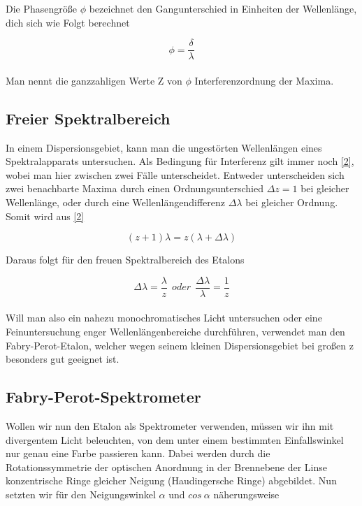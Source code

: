 \documentclass{article}
\begin{document}
Die Phasengröße \(\phi \) bezeichnet den Gangunterschied in Einheiten der Wellenlänge, dich sich wie Folgt berechnet

\begin{equation}
\label{3}
\phi = \frac {\delta}{\lambda}
\end{equation}\\

Man nennt die ganzzahligen Werte Z von \(\phi \) Interferenzordnung der Maxima.

\subsection{Freier Spektralbereich}
In einem Dispersionsgebiet, kann man die ungestörten Wellenlängen eines Spektralapparats untersuchen. Als Bedingung für Interferenz gilt immer noch \eqref{2}, wobei man hier zwischen zwei Fälle unterscheidet. Entweder unterscheiden sich zwei benachbarte Maxima durch einen Ordnungsunterschied \(\Delta z =1 \) bei gleicher Wellenlänge, oder durch eine Wellenlängendifferenz \(\Delta \lambda \) bei gleicher Ordnung.
Somit wird aus \eqref{2} 

\begin{equation}
\label{4}
(z+1) \lambda=z( \lambda + \Delta \lambda)
\end{equation}
\vspace{0,25cm}

Daraus folgt für den freuen Spektralbereich des Etalons

\begin{equation}
\label{5}
\Delta \lambda = \frac {\lambda}{z} \  \ oder \ \ \frac {\Delta \lambda}{\lambda} = \frac {1}{z}
\end{equation}\\

Will man also ein nahezu monochromatisches Licht untersuchen oder eine Feinuntersuchung enger Wellenlängenbereiche durchführen, verwendet man den {\sc Fabry-Perot-Etalon}, welcher wegen seinem kleinen Dispersionsgebiet bei großen z besonders gut geeignet ist.

\subsection{Fabry-Perot-Spektrometer}
Wollen wir nun den Etalon als Spektrometer verwenden, müssen wir ihn mit divergentem Licht beleuchten, von dem unter einem bestimmten Einfallswinkel nur genau eine Farbe passieren kann. Dabei werden durch die Rotationssymmetrie der optischen Anordnung in der Brennebene der Linse konzentrische Ringe gleicher Neigung (Haudingersche Ringe) abgebildet. Nun setzten wir für den Neigungswinkel \(\alpha\) und \(cos\ \alpha \) näherungsweise
\end{document}
